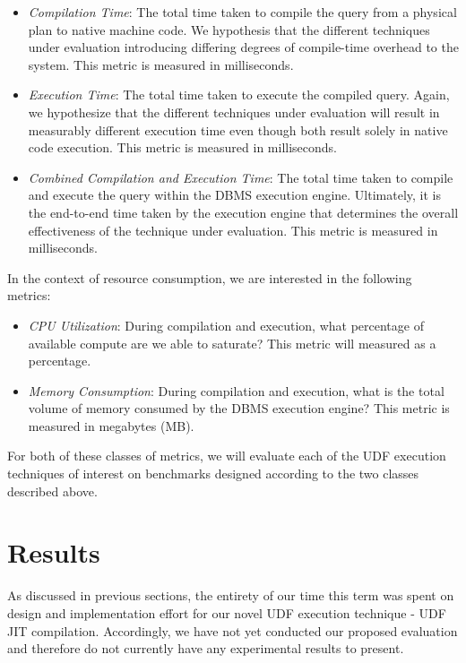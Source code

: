 \documentclass{vldb}
\begin{document}
\begin{itemize}
    \item \textit{Compilation Time}: The total time taken to compile the query from a physical plan to native machine code. We hypothesis that the different techniques under evaluation introducing differing degrees of compile-time overhead to the system. This metric is measured in milliseconds.
    \item \textit{Execution Time}: The total time taken to execute the compiled query. Again, we hypothesize that the different techniques under evaluation will result in measurably different execution time even though both result solely in native code execution. This metric is measured in milliseconds.
    \item \textit{Combined Compilation and Execution Time}: The total time taken to compile and execute the query within the DBMS execution engine. Ultimately, it is the end-to-end time taken by the execution engine that determines the overall effectiveness of the technique under evaluation. This metric is measured in milliseconds.
\end{itemize}

In the context of resource consumption, we are interested in the following metrics:

\begin{itemize}
    \item \textit{CPU Utilization}: During compilation and execution, what percentage of available compute are we able to saturate? This metric will measured as a percentage.
    \item \textit{Memory Consumption}: During compilation and execution, what is the total volume of memory consumed by the DBMS execution engine? This metric is measured in megabytes (MB).
\end{itemize}

For both of these classes of metrics, we will evaluate each of the UDF execution techniques of interest on benchmarks designed according to the two classes described above.


\section{Results}

As discussed in previous sections, the entirety of our time this term was spent on design and implementation effort for our novel UDF execution technique - UDF JIT compilation. Accordingly, we have not yet conducted our proposed evaluation and therefore do not currently have any experimental results to present.
\end{document}
